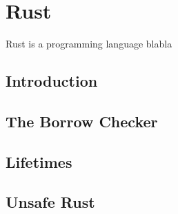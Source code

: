 \chapter{Rust}

Rust is a programming language blabla

\section{Introduction}

\section{The Borrow Checker}

\section{Lifetimes\label{sec:rust-lifetimes}}

\section{Unsafe Rust}
